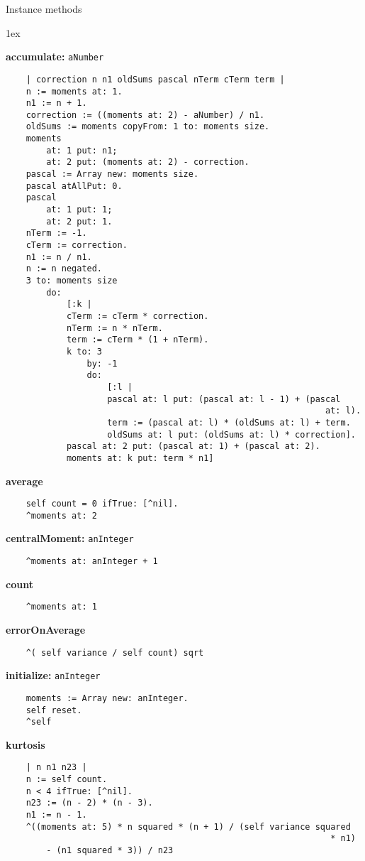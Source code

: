 Instance methods
{\parskip 1ex\par\noindent}
{\bf accumulate:} {\tt aNumber}
\begin{verbatim}
    | correction n n1 oldSums pascal nTerm cTerm term |
    n := moments at: 1.
    n1 := n + 1.
    correction := ((moments at: 2) - aNumber) / n1.
    oldSums := moments copyFrom: 1 to: moments size.
    moments
        at: 1 put: n1;
        at: 2 put: (moments at: 2) - correction.
    pascal := Array new: moments size.
    pascal atAllPut: 0.
    pascal
        at: 1 put: 1;
        at: 2 put: 1.
    nTerm := -1.
    cTerm := correction.
    n1 := n / n1.
    n := n negated.
    3 to: moments size
        do: 
            [:k | 
            cTerm := cTerm * correction.
            nTerm := n * nTerm.
            term := cTerm * (1 + nTerm).
            k to: 3
                by: -1
                do: 
                    [:l | 
                    pascal at: l put: (pascal at: l - 1) + (pascal 
                                                               at: l).
                    term := (pascal at: l) * (oldSums at: l) + term.
                    oldSums at: l put: (oldSums at: l) * correction].
            pascal at: 2 put: (pascal at: 1) + (pascal at: 2).
            moments at: k put: term * n1]

\end{verbatim}
{\bf average}
\begin{verbatim}
    self count = 0 ifTrue: [^nil].
    ^moments at: 2

\end{verbatim}
{\bf centralMoment:} {\tt anInteger}
\begin{verbatim}
    ^moments at: anInteger + 1

\end{verbatim}
{\bf count}
\begin{verbatim}
    ^moments at: 1

\end{verbatim}
{\bf errorOnAverage}
\begin{verbatim}
    ^( self variance / self count) sqrt

\end{verbatim}
{\bf initialize:} {\tt anInteger}
\begin{verbatim}
    moments := Array new: anInteger.
    self reset.
    ^self

\end{verbatim}
{\bf kurtosis}
\begin{verbatim}
    | n n1 n23 |
    n := self count.
    n < 4 ifTrue: [^nil].
    n23 := (n - 2) * (n - 3).
    n1 := n - 1.
    ^((moments at: 5) * n squared * (n + 1) / (self variance squared 
                                                                * n1) 
        - (n1 squared * 3)) / n23

\end{verbatim}
